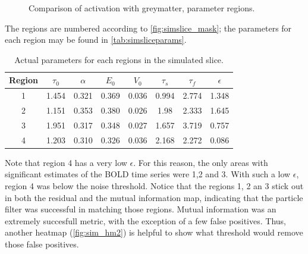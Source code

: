 \begin{figure}[H]
\caption{Comparison of activation with greymatter, parameter regions.}
\label{fig:simslice_hm}
\end{figure}

The regions are numbered according to \autoref{fig:simslice_mask}; the parameters
for each region may be found in \autoref{tab:simsliceparams}. 

\begin{table}[t]
\centering
\begin{tabular}{|c |c | c | c | c | c | c | c |}
\hline 
Region & $\tau_0$ & $\alpha$ & $E_0$    & $V_0$    & $\tau_s$ & $\tau_f$ & $\epsilon$  \\
\hline 
1 & 1.454& 0.321& 0.369& 0.036& 0.994& 2.774& 1.348\\
2 &1.151&  0.353& 0.380& 0.026& 1.98&  2.333& 1.645 \\
3 &1.951&  0.317& 0.348& 0.027& 1.657& 3.719& 0.757 \\
4 &1.203 & 0.310& 0.326& 0.036& 2.168& 2.272& 0.086\\
\hline
\end{tabular}
\caption{Actual parameters for each regions in the simulated slice.}
\label{tab:simsliceparams} 
\end{table}

Note that region 4 has a very low $\epsilon$. For this reason, the only areas
with significant estimates of the BOLD time series were 1,2 and 3. With
such a low $\epsilon$, region 4 was below the noise threshold. Notice that the
regions 1, 2 an 3 stick out in both the residual and the mutual information
map, indicating that the particle filter was successful in matching those regions. 
Mutual information was an extremely succesfull metric, with the exception of 
a few false positives. Thus, another heatmap (\autoref{fig:sim_hm2}) is 
helpful to show what threshold would remove those false positives. 

